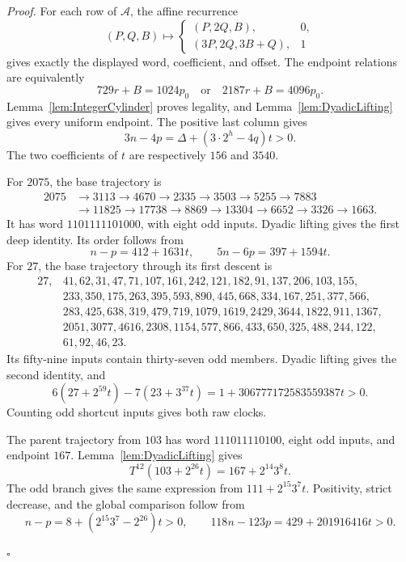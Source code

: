 \documentclass[11pt,letterpaper]{article}
\newenvironment{proof}{\noindent\textit{Proof.}}{\hfill\(\square\)}
\begin{document}
\begin{proof}
For each row of \(\mathcal A\), the affine recurrence
\[
(P,Q,B)\longmapsto
\begin{cases}
(P,2Q,B),&0,\\
(3P,2Q,3B+Q),&1
\end{cases}
\]
gives exactly the displayed word, coefficient, and offset. The endpoint
relations are equivalently
\[
729r+B=1024p_0
\quad\text{or}\quad
2187r+B=4096p_0.
\]
Lemma~\ref{lem:IntegerCylinder} proves legality, and
Lemma~\ref{lem:DyadicLifting} gives every uniform endpoint. The positive
last column gives
\[
3n-4p=\Delta+(3\cdot2^h-4q)t>0.
\]
The two coefficients of \(t\) are respectively \(156\) and \(3540\).

For \(2075\), the base trajectory is
\[
\begin{aligned}
2075&\to3113\to4670\to2335\to3503\to5255\to7883\\
&\to11825\to17738\to8869\to13304\to6652\to3326\to1663.
\end{aligned}
\]
It has word \(1101111101000\), with eight odd inputs. Dyadic lifting gives
the first deep identity. Its order follows from
\[
n-p=412+1631t,
\qquad5n-6p=397+1594t.
\]
For \(27\), the base trajectory through its first descent is
\[
\begin{aligned}
27,&41,62,31,47,71,107,161,242,121,182,91,137,206,103,155,\\
&233,350,175,263,395,593,890,445,668,334,167,251,377,566,\\
&283,425,638,319,479,719,1079,1619,2429,3644,1822,911,1367,\\
&2051,3077,4616,2308,1154,577,866,433,650,325,488,244,122,\\
&61,92,46,23.
\end{aligned}
\]
Its fifty-nine inputs contain thirty-seven odd members. Dyadic lifting gives
the second identity, and
\[
6(27+2^{59}t)-7(23+3^{37}t)
 =1+306777172583559387t>0.
\]
Counting odd shortcut inputs gives both raw clocks.

The parent trajectory from \(103\) has word \(111011110100\), eight odd
inputs, and endpoint \(167\). Lemma~\ref{lem:DyadicLifting} gives
\[
T^{12}(103+2^{26}t)=167+2^{14}3^8t.
\]
The odd branch gives the same expression from
\(111+2^{15}3^7t\). Positivity, strict decrease, and the global comparison
follow from
\[
n-p=8+(2^{15}3^7-2^{26})t>0,
\qquad118n-123p=429+201916416t>0.
\]


\end{proof}
\end{document}
